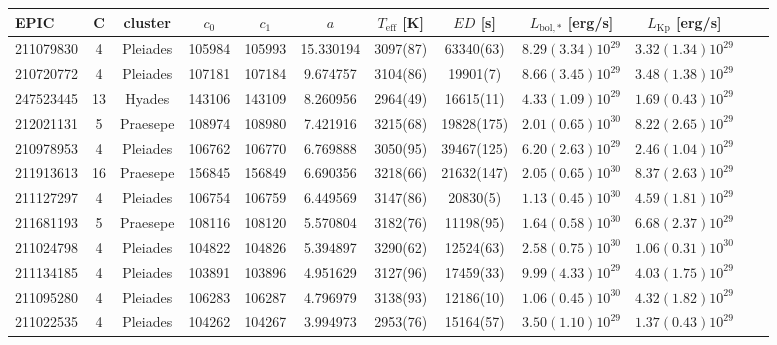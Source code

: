 \begin{tabular}{lccccccccccr}
\hline\hline
      EPIC &   C &   cluster &   $c_0$ &   $c_1$ &        $a$ & $T_\mathrm{eff}$ [K] &    $ED$ [s] & $L_\mathrm{bol,*}$ [erg/s] & $L_\mathrm{Kp}$ [erg/s] \\
\hline
 211079830 &   4 &  Pleiades &  105984 &  105993 &  15.330194 &             3097(87) &   63340(63) &        $8.29(3.34)10^{29}$ &     $3.32(1.34)10^{29}$ \\
 210720772 &   4 &  Pleiades &  107181 &  107184 &   9.674757 &             3104(86) &    19901(7) &        $8.66(3.45)10^{29}$ &     $3.48(1.38)10^{29}$ \\
 247523445 &  13 &    Hyades &  143106 &  143109 &   8.260956 &             2964(49) &   16615(11) &        $4.33(1.09)10^{29}$ &     $1.69(0.43)10^{29}$ \\
 212021131 &   5 &  Praesepe &  108974 &  108980 &   7.421916 &             3215(68) &  19828(175) &        $2.01(0.65)10^{30}$ &     $8.22(2.65)10^{29}$ \\
 210978953 &   4 &  Pleiades &  106762 &  106770 &   6.769888 &             3050(95) &  39467(125) &        $6.20(2.63)10^{29}$ &     $2.46(1.04)10^{29}$ \\
 211913613 &  16 &  Praesepe &  156845 &  156849 &   6.690356 &             3218(66) &  21632(147) &        $2.05(0.65)10^{30}$ &     $8.37(2.63)10^{29}$ \\
 211127297 &   4 &  Pleiades &  106754 &  106759 &   6.449569 &             3147(86) &    20830(5) &        $1.13(0.45)10^{30}$ &     $4.59(1.81)10^{29}$ \\
 211681193 &   5 &  Praesepe &  108116 &  108120 &   5.570804 &             3182(76) &   11198(95) &        $1.64(0.58)10^{30}$ &     $6.68(2.37)10^{29}$ \\
 211024798 &   4 &  Pleiades &  104822 &  104826 &   5.394897 &             3290(62) &   12524(63) &        $2.58(0.75)10^{30}$ &     $1.06(0.31)10^{30}$ \\
 211134185 &   4 &  Pleiades &  103891 &  103896 &   4.951629 &             3127(96) &   17459(33) &        $9.99(4.33)10^{29}$ &     $4.03(1.75)10^{29}$ \\
 211095280 &   4 &  Pleiades &  106283 &  106287 &   4.796979 &             3138(93) &   12186(10) &        $1.06(0.45)10^{30}$ &     $4.32(1.82)10^{29}$ \\
 211022535 &   4 &  Pleiades &  104262 &  104267 &   3.994973 &             2953(76) &   15164(57) &        $3.50(1.10)10^{29}$ &     $1.37(0.43)10^{29}$ \\

\end{tabular}
